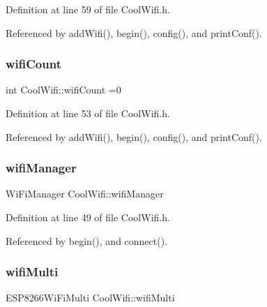 Definition at line 59 of file Cool\+Wifi.\+h.



Referenced by add\+Wifi(), begin(), config(), and print\+Conf().

\mbox{\label{classCoolWifi_ab133bd92fcb895b884deecd6678592e4}} 
\subsubsection{\texorpdfstring{wifi\+Count}{wifiCount}}
{\footnotesize\ttfamily int Cool\+Wifi\+::wifi\+Count =0\hspace{0.3cm}{\ttfamily [private]}}



Definition at line 53 of file Cool\+Wifi.\+h.



Referenced by add\+Wifi(), begin(), config(), and print\+Conf().

\mbox{\label{classCoolWifi_a80dd24fdc56e863f5eb9947dd65a433a}} 
\subsubsection{\texorpdfstring{wifi\+Manager}{wifiManager}}
{\footnotesize\ttfamily Wi\+Fi\+Manager Cool\+Wifi\+::wifi\+Manager\hspace{0.3cm}{\ttfamily [private]}}



Definition at line 49 of file Cool\+Wifi.\+h.



Referenced by begin(), and connect().

\mbox{\label{classCoolWifi_a7862a8c0d7239877e2956c14a368aab8}} 
\subsubsection{\texorpdfstring{wifi\+Multi}{wifiMulti}}
{\footnotesize\ttfamily E\+S\+P8266\+Wi\+Fi\+Multi Cool\+Wifi\+::wifi\+Multi\hspace{0.3cm}{\ttfamily [private]}}



